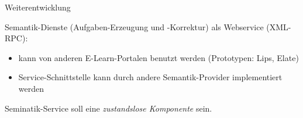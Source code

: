 \begin{slide}{Weiterentwicklung}

  Semantik-Dienste (Aufgaben-Erzeugung und -Korrektur)
  als Webservice (XML-RPC):
  \begin{itemize}
  \item
    kann von anderen E-Learn-Portalen benutzt werden
    (Prototypen: Lips, Elate)
  \item
    Service-Schnittstelle kann durch andere Semantik-Provider
    implementiert werden
  \end{itemize}

Seminatik-Service soll eine \emph{zustandslose Komponente} sein.


\end{slide}
